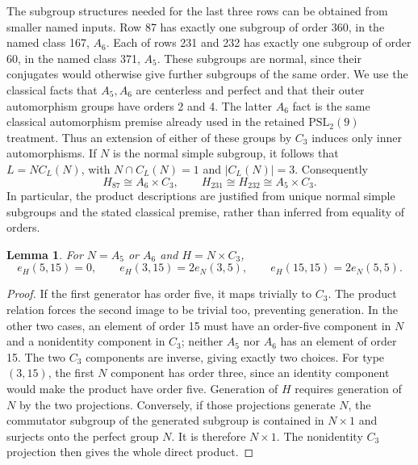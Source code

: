 \documentclass[11pt,a4paper]{article}
\newtheorem{lemma}{Lemma}\newtheorem{proposition}[lemma]{Proposition}
\begin{document}
The subgroup structures needed for the last three rows can be obtained
from smaller named inputs. Row 87 has exactly one subgroup of order
360, in the named class 167, $A_6$. Each of rows 231 and 232 has
exactly one subgroup of order 60, in the named class 371, $A_5$.
These subgroups are normal, since their conjugates would otherwise
give further subgroups of the same order. We use the classical facts
that $A_5,A_6$ are centerless and perfect and that their outer
automorphism groups have orders 2 and 4. The latter $A_6$ fact is
the same classical automorphism premise already used in the retained
$\mathrm{PSL}_2(9)$ treatment. Thus an extension of either of these
groups by $C_3$ induces only inner automorphisms. If $N$ is the
normal simple subgroup, it follows that
$L=N C_L(N)$, with $N\cap C_L(N)=1$ and $|C_L(N)|=3$. Consequently
\[
 H_{87}\cong A_6\times C_3,\qquad
 H_{231}\cong H_{232}\cong A_5\times C_3.       \tag{2}
\]
In particular, the product descriptions are justified from unique
normal simple subgroups and the stated classical premise, rather
than inferred from equality of orders.

\begin{lemma}\label{extension}
For $N=A_5$ or $A_6$ and $H=N\times C_3$,
\[
 e_H(5,15)=0,\qquad e_H(3,15)=2e_N(3,5),\qquad
 e_H(15,15)=2e_N(5,5).
\]
\end{lemma}
\begin{proof}
If the first generator has order five, it maps trivially to $C_3$.
The product relation forces the second image to be trivial too,
preventing generation. In the other two cases, an element of order
15 must have an order-five component in $N$ and a nonidentity
component in $C_3$; neither $A_5$ nor $A_6$ has an element of order
15. The two $C_3$ components are inverse, giving exactly two choices.
For type $(3,15)$, the first $N$ component has order three, since
an identity component would make the product have order five.
Generation of $H$ requires generation of $N$ by the two projections.
Conversely, if those projections generate $N$, the commutator
subgroup of the generated subgroup is contained in $N\times1$ and
surjects onto the perfect group $N$. It is therefore $N\times1$.
The nonidentity $C_3$ projection then gives the whole direct product.
\end{proof}
\end{document}
